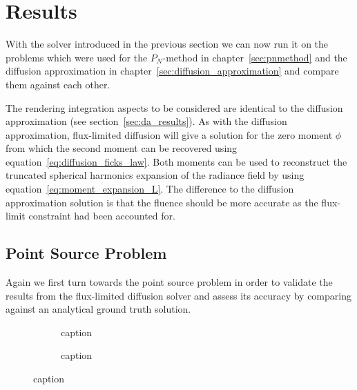 \section{Results}
\label{sec:fld_results}

With the solver introduced in the previous section we can now run it on the problems which were used for the $P_N$-method in chapter~\ref{sec:pnmethod} and the diffusion approximation in chapter~\ref{sec:diffusion_approximation} and compare them against each other.

The rendering integration aspects to be considered are identical to the diffusion approximation (see section~\ref{sec:da_results}). As with the diffusion approximation, flux-limited diffusion will give a solution for the zero moment $\phi$ from which the second moment can be recovered using equation~\ref{eq:diffusion_ficks_law}. Both moments can be used to reconstruct the truncated spherical harmonics expansion of the radiance field by using equation~\ref{eq:moment_expansion_L}. The difference to the diffusion approximation solution is that the fluence should be more accurate as the flux-limit constraint had been accounted for.

\subsection{Point Source Problem}
\label{sec:pn_results_pointsource}

Again we first turn towards the point source problem in order to validate the results from the flux-limited diffusion solver and assess its accuracy by comparing against an analytical ground truth solution.
\begin{figure}[h]
\centering
\begin{subfigure}{0.49\columnwidth}
\caption{caption}
\label{fig:fld_results_pointsource_1}
\end{subfigure}%
\hspace{0.01\columnwidth}
\begin{subfigure}{0.49\columnwidth}
\caption{caption}
\label{fig:fld_results_pointsource_2}
\end{subfigure}%
\caption{caption}
\label{fig:fld_results_pointsource}
\end{figure}

